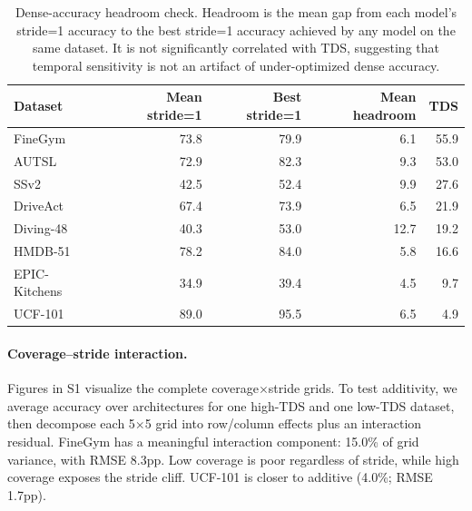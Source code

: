 \documentclass[runningheads]{llncs}
\newcommand{\tabtight}{\setlength{\tabcolsep}{3.5pt}\renewcommand{\arraystretch}{1.12}}
\newcommand{\TDS}{\textsc{TDS}}
\begin{document}
\begin{table}[!htbp]
\centering
\caption{Dense-accuracy headroom check. Headroom is the mean gap from each model's stride=1 accuracy to the best stride=1 accuracy achieved by any model on the same dataset. It is not significantly correlated with \TDS{}, suggesting that temporal sensitivity is not an artifact of under-optimized dense accuracy.}
\label{tab:headroom_check}
\scriptsize\tabtight
\begin{tabular}{l r r r r}
\toprule
Dataset & Mean stride=1 & Best stride=1 & Mean headroom & \TDS{} \\
\midrule
FineGym       & 73.8 & 79.9 &  6.1 & 55.9 \\
AUTSL         & 72.9 & 82.3 &  9.3 & 53.0 \\
SSv2          & 42.5 & 52.4 &  9.9 & 27.6 \\
DriveAct      & 67.4 & 73.9 &  6.5 & 21.9 \\
Diving-48     & 40.3 & 53.0 & 12.7 & 19.2 \\
HMDB-51       & 78.2 & 84.0 &  5.8 & 16.6 \\
EPIC-Kitchens & 34.9 & 39.4 &  4.5 &  9.7 \\
UCF-101       & 89.0 & 95.5 &  6.5 &  4.9 \\
\bottomrule
\end{tabular}
\end{table}

\paragraph{Coverage--stride interaction.}
Figures in S1 visualize the complete coverage$\times$stride grids. To test additivity, we average accuracy over architectures for one high-\TDS{} and one low-\TDS{} dataset, then decompose each 5$\times$5 grid into row/column effects plus an interaction residual. FineGym has a meaningful interaction component: 15.0\% of grid variance, with RMSE 8.3pp. Low coverage is poor regardless of stride, while high coverage exposes the stride cliff. UCF-101 is closer to additive (4.0\%; RMSE 1.7pp).
\end{document}
